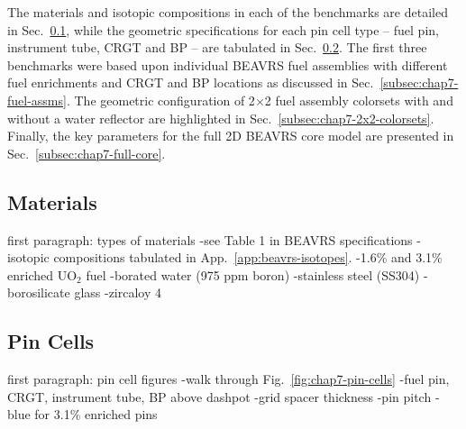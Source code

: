 
The materials and isotopic compositions in each of the benchmarks are detailed in Sec.~\ref{subsec:chap7-materials}, while the geometric specifications for each pin cell type -- fuel pin, instrument tube, \ac{CRGT} and \ac{BP} -- are tabulated in Sec.~\ref{subsec:chap7-pin-cells}. The first three benchmarks were based upon individual \ac{BEAVRS} fuel assemblies with different fuel enrichments and \ac{CRGT} and \ac{BP} locations as discussed in Sec.~\ref{subsec:chap7-fuel-assms}. The geometric configuration of 2$\times$2 fuel assembly colorsets with and without a water reflector are highlighted in Sec.~\ref{subsec:chap7-2x2-colorsets}. Finally, the key parameters for the full 2D \ac{BEAVRS} core model are presented in Sec.~\ref{subsec:chap7-full-core}.


\subsection{Materials}
\label{subsec:chap7-materials}

first paragraph: types of materials
-see Table 1 in BEAVRS specifications
-isotopic compositions tabulated in App.~\ref{app:beavrs-isotopes}.
-1.6\% and 3.1\% enriched UO$_2$ fuel
-borated water (975 ppm boron)
-stainless steel (SS304)
-borosilicate glass
-zircaloy 4

\subsection{Pin Cells}
\label{subsec:chap7-pin-cells}

first paragraph: pin cell figures
-walk through Fig.~\ref{fig:chap7-pin-cells}
-fuel pin, \ac{CRGT}, instrument tube, \ac{BP} above dashpot
-grid spacer thickness
-pin pitch
-blue for 3.1\% enriched pins

